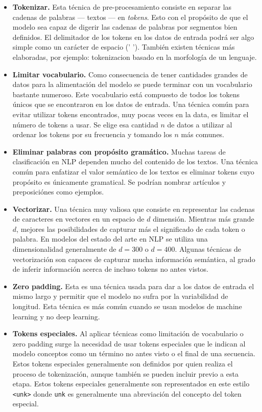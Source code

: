\begin{itemize}
\item \textbf{Tokenizar.} Esta técnica de pre-procesamiento consiste en separar las cadenas de palabras --- textos --- en \emph{tokens}. Esto con el propósito de que el modelo sea capaz de digerir las cadenas de palabras por segmentos bien definidos. El delimitador de los tokens en los datos de entrada podrá ser algo simple como un carácter de espacio (' '). También existen técnicas más elaboradas, por ejemplo: \gls{tokenizacion} basado en la morfología de un lenguaje.
\item \textbf{Limitar \gls{vocabulario}.} Como consecuencia de tener cantidades grandes de datos para la alimentación del modelo se puede terminar con un vocabulario bastante numeroso. Este vocabulario está compuesto de todos los tokens únicos que se encontraron en los datos de entrada. Una técnica común para evitar utilizar tokens encontrados, muy pocas veces en la data, es limitar el número de tokens a usar. Se elige esa cantidad $n$ de datos a utilizar al ordenar los tokens por su frecuencia y tomando los $n$ más comunes.
\item \textbf{Eliminar palabras con propósito gramático.} Muchas tareas de clasificación en NLP dependen mucho del contenido de los textos. Una técnica común para enfatizar el valor semántico de los textos es eliminar tokens cuyo propósito es únicamente gramatical. Se podrían nombrar artículos y preposiciónes como ejemplos.
\item \textbf{Vectorizar.} Una técnica muy valiosa que consiste en representar las cadenas de caracteres en vectores en un espacio de $d$ dimensión. Mientras más grande $d$, mejores las posibilidades de capturar más el significado de cada token o palabra. En modelos del estado del arte en NLP se utiliza una dimensionalidad generalmente de $d = 300$ o $d = 400$. Algunas técnicas de vectorización son capaces de capturar mucha información semántica, al grado de inferir información acerca de incluso tokens no antes vistos.
\item \textbf{Zero padding.} Esta es una técnica usada para dar a los datos de entrada el mismo largo y permitir que el modelo no sufra por la variabilidad de longitud. Esta técnica es más común cuando se usan modelos de machine learning y no deep learning.
\item \textbf{Tokens especiales.} Al aplicar técnicas como limitación de vocabulario o zero padding surge la necesidad de usar tokens especiales que le indican al modelo conceptos como un término no antes visto o el final de una secuencia. Estos tokens especiales generalmente son definidos por quien realiza el proceso de tokenización, aunque también se pueden incluir previo a esta etapa. Estos tokens especiales generalmente son representados en este estilo \texttt{<unk>} donde \texttt{unk} es generalmente una abreviación del concepto del token especial. 
\end{itemize}

